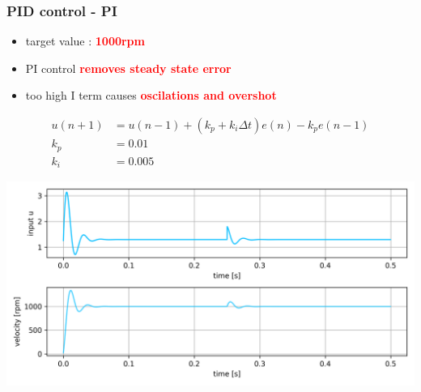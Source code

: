 \documentclass{beamer}
\begin{document}
\begin{frame}
  
  \frametitle{\textbf { PID control - PI}}

  \begin{itemize}
    \item  target value : \textcolor{red}{\textbf { 1000rpm}}
    \item  PI control \textcolor{red}{\textbf { removes steady state error}}
    \item  too high I term causes \textcolor{red}{\textbf { oscilations and overshot}}
  \end{itemize}

  \begin{align*}
    u(n+1) &= u(n-1) + (k_p + k_i\Delta t) e(n) - k_pe(n-1) \\
    k_p    &= 0.01 \\
    k_i    &= 0.005
  \end{align*}

  {\centering \includegraphics[scale=0.4]{../images/motor_control/pid_pi_control_0.png}}

\end{frame}
\end{document}
